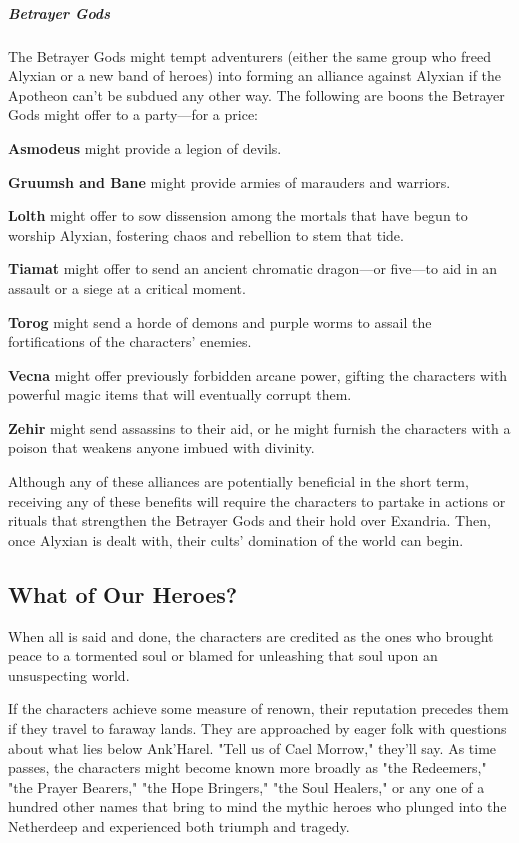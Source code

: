 \documentclass[10pt,a4paper,twoside,bg=print,twocolumn,openany,nodeprecatedcode]{dndbook}
\begin{document}
\subparagraph{Betrayer Gods}
The Betrayer Gods might tempt adventurers (either the same group who freed Alyxian or a new band of heroes) into forming an alliance against Alyxian if the Apotheon can't be subdued any other way. The following are boons the Betrayer Gods might offer to a party—for a price:

\textbf{Asmodeus} might provide a legion of devils.

\textbf{Gruumsh and Bane} might provide armies of marauders and warriors.

\textbf{Lolth} might offer to sow dissension among the mortals that have begun to worship Alyxian, fostering chaos and rebellion to stem that tide.

\textbf{Tiamat} might offer to send an ancient chromatic dragon—or five—to aid in an assault or a siege at a critical moment.

\textbf{Torog} might send a horde of demons and purple worms to assail the fortifications of the characters' enemies.

\textbf{Vecna} might offer previously forbidden arcane power, gifting the characters with powerful magic items that will eventually corrupt them.

\textbf{Zehir} might send assassins to their aid, or he might furnish the characters with a poison that weakens anyone imbued with divinity.

Although any of these alliances are potentially beneficial in the short term, receiving any of these benefits will require the characters to partake in actions or rituals that strengthen the Betrayer Gods and their hold over Exandria. Then, once Alyxian is dealt with, their cults' domination of the world can begin.

\subsection{What of Our Heroes?}
When all is said and done, the characters are credited as the ones who brought peace to a tormented soul or blamed for unleashing that soul upon an unsuspecting world.

If the characters achieve some measure of renown, their reputation precedes them if they travel to faraway lands. They are approached by eager folk with questions about what lies below Ank'Harel. "Tell us of Cael Morrow," they'll say. As time passes, the characters might become known more broadly as "the Redeemers," "the Prayer Bearers," "the Hope Bringers," "the Soul Healers," or any one of a hundred other names that bring to mind the mythic heroes who plunged into the Netherdeep and experienced both triumph and tragedy.
\end{document}
